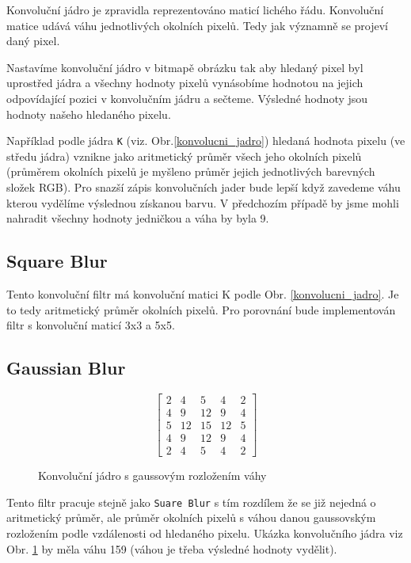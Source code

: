 \documentclass[12pt]{article}
\begin{document}
Konvoluční jádro je zpravidla reprezentováno maticí lichého řádu. Konvoluční matice udává váhu jednotlivých okolních pixelů. Tedy jak významně se projeví daný pixel.

Nastavíme konvoluční jádro v bitmapě obrázku tak aby hledaný pixel byl uprostřed jádra a všechny hodnoty pixelů vynásobíme hodnotou na jejich odpovídající pozici v konvolučním jádru a sečteme. Výsledné hodnoty jsou hodnoty našeho hledaného pixelu.

Například podle jádra \texttt{K} (viz. Obr.\ref{konvolucni_jadro}) hledaná hodnota pixelu (ve středu jádra) vznikne jako aritmetický průměr všech jeho okolních pixelů (průměrem okolních pixelů je myšleno průměr jejich jednotlivých barevných složek RGB). Pro snazší zápis konvolučních jader bude lepší když zavedeme váhu kterou vydělíme výslednou získanou barvu. V předchozím případě by jsme mohli nahradit všechny hodnoty jedničkou a váha by byla 9.

\subsection{Square Blur}
Tento konvoluční filtr má konvoluční matici K podle Obr. \ref{konvolucni_jadro}. Je to tedy aritmetický průměr okolních pixelů. Pro porovnání bude implementován filtr s konvoluční maticí 3x3 a 5x5. 

\subsection{Gaussian Blur}
\begin{figure}
\vspace{-20pt}
\[
  \begin{bmatrix}
    2 	& 4 	& 5 	& 4 	& 2\\
    4 	& 9 	& 12 	& 9 	& 4\\
    5	& 12	& 15	& 12	& 5\\
    4	& 9		& 12	& 9		& 4\\
    2 	& 4 	& 5 	& 4 	& 2
  \end{bmatrix}
\]
\caption{Konvoluční jádro s gaussovým rozložením váhy}
\label{konvolucni_jadro_gauss}
\end{figure}

Tento filtr pracuje stejně jako \texttt{Suare Blur} s tím rozdílem že se již nejedná o aritmetický průměr, ale průměr okolních pixelů s váhou danou gaussovským rozložením podle vzdálenosti od hledaného pixelu. Ukázka konvolučního jádra viz Obr. \ref{konvolucni_jadro_gauss} by měla váhu 159 (váhou je třeba výsledné hodnoty vydělit). 
\end{document}
